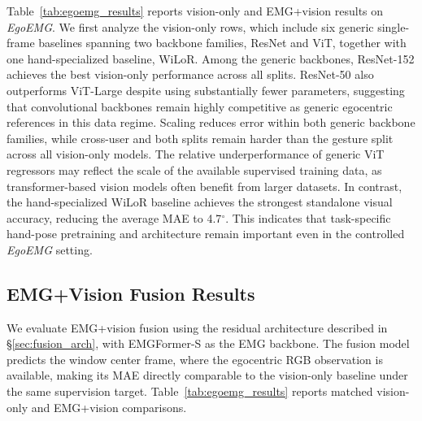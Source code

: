 \documentclass{article}
\newcommand{\dataset}{\textit{EgoEMG}}
\newcommand{\model}{EMGFormer}
\begin{document}
Table~\ref{tab:egoemg_results} reports vision-only and EMG+vision results on
\dataset{}. We first analyze the vision-only rows, which include six generic
single-frame baselines spanning two backbone families, ResNet and ViT, together
with one hand-specialized baseline, WiLoR. Among the generic backbones,
ResNet-152 achieves the best vision-only performance across all splits.
ResNet-50 also outperforms ViT-Large despite using substantially fewer
parameters, suggesting that convolutional backbones remain highly competitive as
generic egocentric references in this data regime. Scaling reduces error within
both generic backbone families, while cross-user and both splits remain harder
than the gesture split across all vision-only models. The relative
underperformance of generic ViT regressors may reflect the scale of the
available supervised training data, as transformer-based vision models often
benefit from larger datasets. In contrast, the hand-specialized WiLoR baseline
achieves the strongest standalone visual accuracy, reducing the average MAE to
4.7$^\circ$. This indicates that task-specific hand-pose pretraining and
architecture remain important even in the controlled \dataset{} setting.

\subsection{EMG+Vision Fusion Results}
\label{sec:cross_modal}

We evaluate EMG+vision fusion using the residual architecture described in
\S\ref{sec:fusion_arch}, with \model{}-S as the EMG backbone. The fusion
model predicts the window center frame, where the egocentric RGB observation is
available, making its MAE directly comparable to the vision-only baseline under
the same supervision target. Table~\ref{tab:egoemg_results} reports matched
vision-only and EMG+vision comparisons.
\end{document}
